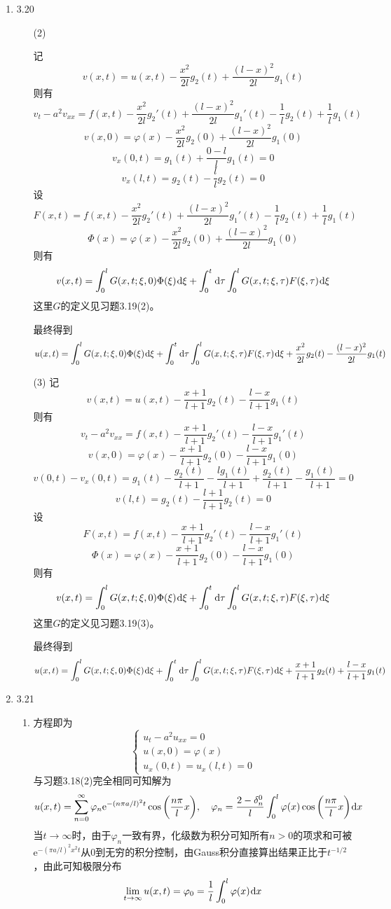 \documentclass[a4paper,UTF8,fontset=windows,10pt]{ctexart}
\newcommand*{\dr}{\hspace{0.07em}\mathrm{d}}
\newcommand*{\er}{\mathrm{e}}
\begin{document}
\begin{enumerate}
    \item 3.20
    \begin{enumerate}
        \item[(2)]
        
        记
        $$v(x,t)=u(x,t)-\frac{x^2}{2l}g_2(t)+\frac{(l-x)^2}{2l}g_1(t)$$
        则有
        $$v_t-a^2v_{xx}=f(x,t)-\frac{x^2}{2l}g_2'(t)+\frac{(l-x)^2}{2l}g_1'(t)-\frac{1}{l}g_2(t)+\frac{1}{l}g_1(t)$$
        $$v(x,0)=\varphi(x)-\frac{x^2}{2l}g_2(0)+\frac{(l-x)^2}{2l}g_1(0)$$
        $$v_x(0,t)=g_1(t)+\frac{0-l}{l}g_1(t)=0$$
        $$v_x(l,t)=g_2(t)-\frac{l}{l}g_2(t)=0$$
        设
        $$F(x,t)=f(x,t)-\frac{x^2}{2l}g_2'(t)+\frac{(l-x)^2}{2l}g_1'(t)-\frac{1}{l}g_2(t)+\frac{1}{l}g_1(t)$$
        $$\Phi(x)=\varphi(x)-\frac{x^2}{2l}g_2(0)+\frac{(l-x)^2}{2l}g_1(0)$$
        则有
        $$v(x,t)=\int_0^lG(x,t;\xi,0)\Phi(\xi)\dr\xi+\int_0^t\dr\tau\int_0^lG(x,t;\xi,\tau)F(\xi,\tau)\dr\xi$$
        这里$G$的定义见习题3.19(2)。
    
        最终得到
        $$u(x,t)=\int_0^lG(x,t;\xi,0)\Phi(\xi)\dr\xi+\int_0^t\dr\tau\int_0^lG(x,t;\xi,\tau)F(\xi,\tau)\dr\xi+\frac{x^2}{2l}g_2(t)-\frac{(l-x)^2}{2l}g_1(t)$$
    
        \item[(3)] 记
        $$v(x,t)=u(x,t)-\frac{x+1}{l+1}g_2(t)-\frac{l-x}{l+1}g_1(t)$$
        则有
        $$v_t-a^2v_{xx}=f(x,t)-\frac{x+1}{l+1}g_2'(t)-\frac{l-x}{l+1}g_1'(t)$$
        $$v(x,0)=\varphi(x)-\frac{x+1}{l+1}g_2(0)-\frac{l-x}{l+1}g_1(0)$$
        $$v(0,t)-v_x(0,t)=g_1(t)-\frac{g_2(t)}{l+1}-\frac{lg_1(t)}{l+1}+\frac{g_2(t)}{l+1}-\frac{g_1(t)}{l+1}=0$$
        $$v(l,t)=g_2(t)-\frac{l+1}{l+1}g_2(t)=0$$
        设
        $$F(x,t)=f(x,t)-\frac{x+1}{l+1}g_2'(t)-\frac{l-x}{l+1}g_1'(t)$$
        $$\Phi(x)=\varphi(x)-\frac{x+1}{l+1}g_2(0)-\frac{l-x}{l+1}g_1(0)$$
        则有
        $$v(x,t)=\int_0^lG(x,t;\xi,0)\Phi(\xi)\dr\xi+\int_0^t\dr\tau\int_0^lG(x,t;\xi,\tau)F(\xi,\tau)\dr\xi$$
        这里$G$的定义见习题3.19(3)。
    
        最终得到
        $$u(x,t)=\int_0^lG(x,t;\xi,0)\Phi(\xi)\dr\xi+\int_0^t\dr\tau\int_0^lG(x,t;\xi,\tau)F(\xi,\tau)\dr\xi+\frac{x+1}{l+1}g_2(t)+\frac{l-x}{l+1}g_1(t)$$
    \end{enumerate}
    
    \item 3.21
    \begin{enumerate}[(1)]
        \item 方程即为
        $$\begin{cases}u_t-a^2u_{xx}=0\\u(x,0)=\varphi(x)\\u_x(0,t)=u_x(l,t)=0\end{cases}$$
        与习题3.18(2)完全相同可知解为
        $$u(x,t)=\sum_{n=0}^\infty\varphi_n\er^{-(n\pi a/l)^2t}\cos\bigg(\frac{n\pi}{l}x\bigg),\quad\varphi_n=\frac{2-\delta_n^0}{l}\int_0^l\varphi(x)\cos\bigg(\frac{n\pi}{l}x\bigg)\dr x$$
        当$t\to\infty$时，由于$\varphi_n$一致有界，化级数为积分可知所有$n>0$的项求和可被$\er^{-(\pi a/l)^2x^2t}$从0到无穷的积分控制，由Gauss积分直接算出结果正比于$t^{-1/2}$，由此可知极限分布
        $$\lim_{t\to\infty}u(x,t)=\varphi_0=\frac{1}{l}\int_0^l\varphi(x)\dr x$$
    

\end{enumerate}
\end{enumerate}
\end{document}
